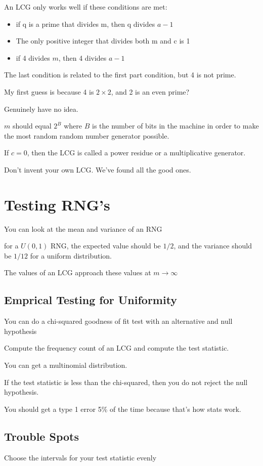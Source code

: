 \documentclass[fleqn]{report}
\begin{document}
An LCG only works well if these conditions are met: 
\begin{itemize}
    \item 
    if q is a prime that divides m, then q divides $a-1$ 
    \item 
    The only positive integer that divides both m and c is 1 
    \item 
    if 4 divides $m$, then 4 divides $a - 1$ 
\end{itemize}

The last condition is related to the first part condition, but 4 is not prime. 

My first guess is because 4 is $2 \times 2$, and 2 is an even prime? 

Genuinely have no idea. 

$m$ should equal $2^B$ where $B$ is the number of bits in the machine in 
order to make the most random random number generator possible. 

If $c = 0$, then the LCG is called a power residue or a multiplicative generator. 

Don't invent your own LCG. We've found all the good ones. 

\section{Testing RNG's}
You can look at the mean and variance of an RNG 

for a $U(0, 1)$ RNG, the expected value should be $1/2$, and the variance 
should be $1/12$ for a uniform distribution. 

The values of an LCG approach these values at $m \to \infty$ 

\subsection{Emprical Testing for Uniformity}
You can do a chi-squared goodness of fit test with an alternative and 
null hypothesis 

Compute the frequency count of an LCG and compute the test statistic. 

You can get a multinomial distribution. 

If the test statistic is less than the chi-squared, then you do not 
reject the null hypothesis. 

You should get a type 1 error 5\% of the time because that's how stats work. 

\subsection{Trouble Spots}
Choose the intervals for your test statistic evenly 
\end{document}
